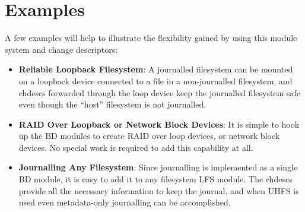\section{Examples}
\label{sec:examples}

A few examples will help to illustrate the flexibility gained by using this
module system and change descriptors:

\begin{itemize}
\item \itemvspace{} {\bf Reliable Loopback Filesystem}: A journalled filesystem
  can be mounted on a loopback device connected to a file in a non-journalled
  filesystem, and chdescs forwarded through the loop device keep the journalled
  filesystem safe even though the ``host'' filesystem is not journalled.
\item \itemvspace{} {\bf RAID Over Loopback or Network Block Devices}: It is
  simple to hook up the BD modules to create RAID over loop devices, or network
  block devices. No special work is required to add this capability at all.
\item \itemvspace{} {\bf Journalling Any Filesystem}: Since journalling is
  implemented as a single BD module, it is easy to add it to any filesystem LFS
  module. The chdescs provide all the necessary information to keep the journal,
  and when UHFS is used even metadata-only journalling can be accomplished.
\end{itemize}
\postlistspacing{}
